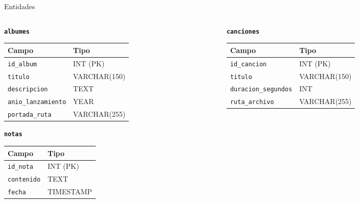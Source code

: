 \documentclass[aspectratio=169, 10pt]{beamer}
\begin{document}
\begin{frame}[t]{Entidades}
\begin{columns}[T]
        \begin{column}{0.32\textwidth}
            \centering
            \textbf{\texttt{albumes}}\par\vspace{0.05cm}
            \begin{tabular}{ll}
                \toprule
                \textbf{Campo} & \textbf{Tipo} \\
                \midrule
                \texttt{id\_album} & INT (PK) \\
                \texttt{titulo} & VARCHAR(150) \\
                \texttt{descripcion} & TEXT \\
                \texttt{anio\_lanzamiento} & YEAR \\
                \texttt{portada\_ruta} & VARCHAR(255) \\
                \bottomrule
            \end{tabular}

            \vspace{0.25cm}
            \textbf{\texttt{notas}}\par\vspace{0.05cm}
            \begin{tabular}{ll}
                \toprule
                \textbf{Campo} & \textbf{Tipo} \\
                \midrule
                \texttt{id\_nota} & INT (PK) \\
                \texttt{contenido} & TEXT \\
                \texttt{fecha} & TIMESTAMP \\
                \bottomrule
            \end{tabular}
        \end{column}

        \begin{column}{0.32\textwidth}
            \centering
            \textbf{\texttt{canciones}}\par\vspace{0.05cm}
            \begin{tabular}{ll}
                \toprule
                \textbf{Campo} & \textbf{Tipo} \\
                \midrule
                \texttt{id\_cancion} & INT (PK) \\
                \texttt{titulo} & VARCHAR(150) \\
                \texttt{duracion\_segundos} & INT \\
                \texttt{ruta\_archivo} & VARCHAR(255) \\
                \bottomrule
            \end{tabular}


\end{column}
\end{columns}
\end{frame}
\end{document}
